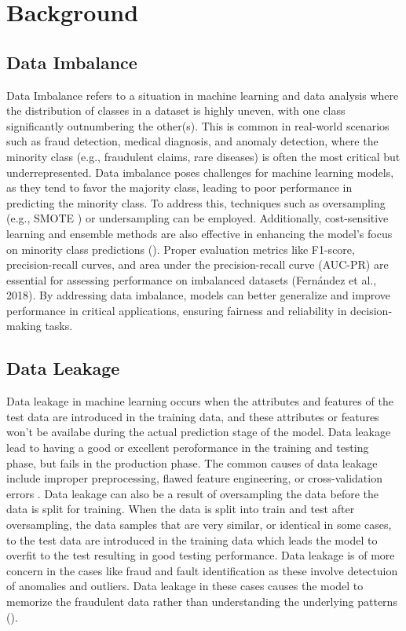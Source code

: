 \documentclass[twoside,11pt]{article}
\begin{document}
\section{Background} \label{sec:background}
\subsection{Data Imbalance}
Data Imbalance refers to a situation in machine learning and data analysis where the distribution of classes in a dataset is highly uneven, with one class significantly outnumbering the other(s). This is common in real-world scenarios such as fraud detection, medical diagnosis, and anomaly detection, where the minority class (e.g., fraudulent claims, rare diseases) is often the most critical but underrepresented. Data imbalance poses challenges for machine learning models, as they tend to favor the majority class, leading to poor performance in predicting the minority class.
To address this, techniques such as oversampling (e.g., SMOTE \citealp{chawlaSMOTESyntheticMinority2002}) or undersampling can be employed. Additionally, cost-sensitive learning and ensemble methods are also effective in enhancing the model's focus on minority class predictions (\citealp{garcia2009}). Proper evaluation metrics like F1-score, precision-recall curves, and area under the precision-recall curve (AUC-PR) are essential for assessing performance on imbalanced datasets (Fernández et al., 2018).
By addressing data imbalance, models can better generalize and improve performance in critical applications, ensuring fairness and reliability in decision-making tasks.

\subsection{Data Leakage}
Data leakage in machine learning occurs when the attributes and features of the test data are introduced in the training data, and these attributes or features won't be availabe during the actual prediction stage of the model. Data leakage lead to having a good or excellent peroformance in the training and testing phase, but fails in the production phase. The common causes of data leakage include improper preprocessing, flawed feature engineering, or cross-validation errors \cite{Kaufman2012}. Data leakage can also be a result of oversampling the data before the data is split for training. When the data is split into train and test after oversampling, the data samples that are very similar, or identical in some cases, to the test data are introduced in the training data which leads the model to overfit to the test resulting in good testing performance. Data leakage is of more concern in the cases like fraud and fault identification as these involve detectuion of anomalies and outliers. Data leakage in these cases causes the model to memorize the fraudulent data rather than understanding the underlying patterns (\citealp{baesensRobROSERobustApproach2021}).
\end{document}
